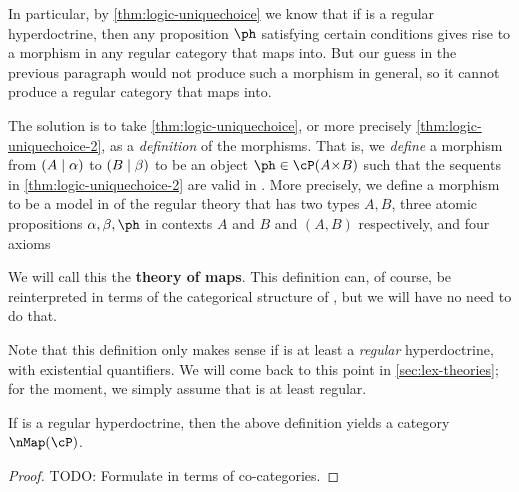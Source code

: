 \begin{wip}
In particular, by \cref{thm:logic-uniquechoice} we know that if \cP is a regular hyperdoctrine, then any proposition $\ph$ satisfying certain conditions gives rise to a morphism in any regular category that \cP maps into.
But our guess in the previous paragraph would not produce such a morphism in general, so it cannot produce a regular category that \cP maps into.

The solution is to take \cref{thm:logic-uniquechoice}, or more precisely \cref{thm:logic-uniquechoice-2}, as a \emph{definition} of the morphisms.
That is, we \emph{define} a morphism from $(A\mid\alpha)$ to $(B\mid\beta)$ to be an object $\ph\in \cP(A\times B)$ such that the sequents in \cref{thm:logic-uniquechoice-2} are valid in \cP.
More precisely, we define a morphism to be a model in \cP of the regular theory that has two types $A,B$, three atomic propositions $\alpha,\beta,\ph$ in contexts $A$ and $B$ and $(A,B)$ respectively, and four axioms
We will call this the \textbf{theory of maps}.
This definition can, of course, be reinterpreted in terms of the categorical structure of \cP, but we will have no need to do that.

Note that this definition only makes sense if \cP is at least a \emph{regular} hyperdoctrine, with existential quantifiers.
We will come back to this point in \cref{sec:lex-theories}; for the moment, we simply assume that \cP is at least regular.

\begin{thm}\label{thm:hdmap-cat}
  If \cP is a regular hyperdoctrine, then the above definition yields a category $\nMap(\cP)$.
\end{thm}
\begin{proof}
  TODO: Formulate in terms of co-categories.


\end{proof}
\end{wip}
